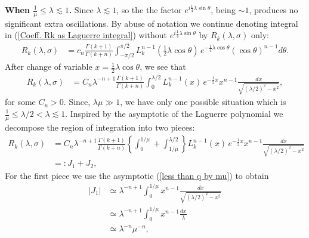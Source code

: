 \documentclass[11pt, reqno]{amsart}
\theoremstyle{plain}
\theoremstyle{remark}
\theoremstyle{example}
\theoremstyle{definition}
\numberwithin{equation}{section}
\begin{document}
\noindent \textbf{When $ \frac{1}{\mu} \leq \lambda \lesssim 1$. } Since $\lambda \lesssim 1$, so the the factor $ e^{i \frac{1}{4} \lambda \sin{\theta}}$, being $\sim 1$, produces no  significant extra oscillations. By abuse of notation we continue denoting  integral in (\ref{Coeff. Rk as Laguerre integral})  without $ e^{i \frac{1}{4} \lambda \sin{\theta}}$ by $R_{k}(\lambda, \sigma)$ only:
\begin{equation}\label{lambda less than 1 Coeff. Rk }
   \begin{split}
        R_{k}(\lambda, \sigma) 
        & = c_{n} \frac{\Gamma(k+1)}{\Gamma(k+n)} \int_{- \pi/2}^{\pi/2} L_{k}^{n-1} \left( {\textstyle\frac{1}{2} } \lambda  \cos{\theta}  \right) \, e^{-\frac{1}{4} \lambda \cos{\theta}}  (\cos{\theta})^{n-1} d \theta.
   \end{split}
\end{equation}
After change of variable $x = \frac{1}{2} \lambda \cos{\theta}$, we see that
\begin{equation}\label{x var. lambda less than 1 Coeff. Rk}
   \begin{split}
        R_{k}(\lambda, \sigma)
        & = C_{n} \lambda^{-n +1} \frac{\Gamma(k+1)}{\Gamma(k+n)}  \int_{0}^{ \lambda /2}  L_{k}^{n-1}(x) \, e^{-\frac{1}{2} x }  x^{n-1} \frac{dx}{\sqrt{(\lambda/2)^2 -  x^2}},
   \end{split}
\end{equation}
for some $C_n>0$. Since, $\lambda \mu \gg 1$, we have only one possible situation which is $\frac{1}{\mu} \leq \lambda /2 < \lambda \lesssim 1$. Inspired by the asymptotic of the Laguerre polynomial we decompose the region of integration into two pieces:
\begin{equation}\label{split lambda less than 1 Coeff. Rk }
   \begin{split}
         R_{k}(\lambda, \sigma)
        & = C_{n} \lambda^{-n +1} \frac{\Gamma(k+1)}{\Gamma(k+n)} \left\lbrace  \int_{0}^{ 1 / \mu} + \int_{1/ \mu}^{ \lambda /2}  \right\rbrace L_{k}^{n-1}(x) \, e^{-\frac{1}{2} x }  x^{n-1} \frac{dx}{\sqrt{(\lambda/2)^2 -  x^2}}\\
        & =: J_{1} + J_{2},
   \end{split}
\end{equation}
For the first piece we use the asymptotic (\ref{less than q by mu}) to obtain
\begin{equation*}
   \begin{split}
         |J_{1}|
        & \simeq \lambda^{-n +1}   \int_{0}^{ 1 / \mu}      x^{n-1} \frac{dx}{\sqrt{(\lambda/2)^2 -  x^2}}\\
        & \simeq  \lambda^{-n +1}   \int_{0}^{ 1 / \mu}      x^{n-1} \frac{dx}{\lambda}\\
        & \simeq \lambda^{-n}   \mu^{-n},
   \end{split}
\end{equation*}
\end{document}
